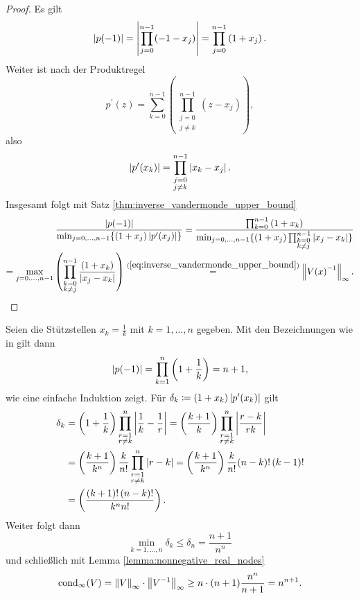 \begin{proof}
    Es gilt
    \[
        \abs{p(-1)} = \abs{\prod_{j=0}^{n-1} (-1 - x_j)} = \prod_{j=0}^{n-1} \left( 1 + x_j \right).
    \]
    Weiter ist nach der Produktregel
    \[
        p^{\prime}(z) = \sum_{k=0}^{n-1} \left( \prod_{\substack{j=0\\ j\neq k}}^{n-1} \left( z - x_j \right) \right),
    \]
    also
    \[
        \abs{p^{\prime}(x_k)} = \prod_{\substack{j=0\\ j\neq k}}^{n-1} \abs{ x_k - x_j }.
    \]
    Insgesamt folgt mit Satz \ref{thm:inverse_vandermonde_upper_bound}
    \[
        \begin{split}
            \frac{ \abs{p(-1)}}{\min_{j=0, \dots, n-1} \{ (1+x_j) \abs{p^{\prime}(x_j)} \}}
            = \frac{\prod_{k=0}^{n-1} \left( 1 + x_k \right)}{\min_{j=0, \dots, n-1} \{ (1+x_j) \prod_{\substack{k=0\\ k\neq j}}^{n-1} \abs{ x_j - x_k }\}}\\
            = \max_{j=0, \dots, n-1} \left( \prod_{\substack{k=0\\ k \neq j}}^{n-1} \frac{\left( 1 + x_k \right)}{\abs{ x_j - x_k }} \right)
            \overset{(\ref{eq:inverse_vandermonde_upper_bound})}{=} \norm{\Vand{x}^{-1}}_{\infty}.
        \end{split}
    \]
\end{proof}

\begin{example}
    Seien die Stützstellen $x_k = \frac{1}{k}$ mit $k=1, \dots, n$ gegeben.
    Mit den Bezeichnungen wie in  gilt dann
    \[
        \abs{p(-1)} = \prod_{k=1}^{n} \left( 1 + \frac{1}{k} \right) = n+1,
    \]
    wie eine einfache Induktion zeigt.
    Für $\delta_k \defeq (1 + x_k) \abs{ p^{\prime}(x_k) }$ gilt
    \[
        \begin{split}
            \delta_k &= \left( 1 + \frac{1}{k} \right) \prod_{\substack{r = 1\\ r\neq k}}^n \abs{ \frac{1}{k} - \frac{1}{r} }
                     = \left( \frac{k+1}{k} \right) \prod_{\substack{r = 1\\ r\neq k}}^n \abs{ \frac{r-k}{rk}}\\
                     &= \left( \frac{k+1}{k^n} \right) \frac{k}{n!} \prod_{\substack{r = 1\\ r\neq k}}^n \abs{ r-k }
                     = \left( \frac{k+1}{k^n} \right) \frac{k}{n!} (n-k)! \, (k-1)!\\
                     &= \left( \frac{(k+1)! \, (n-k)!}{k^n n!} \right).
        \end{split}
    \]
    Weiter folgt dann
    \[
        \min_{k=1, \dots, n} \delta_k \leq \delta_n = \frac{n+1}{n^n}
    \]
    und schließlich mit Lemma \ref{lemma:nonnegative_real_nodes}
    \[
        \cond[\infty]{V} = \norm{V}_\infty \cdot \norm{V^{-1}}_\infty \geq n \cdot (n+1) \frac{n^n}{n+1} = n^{n+1}.
    \]
\end{example}

